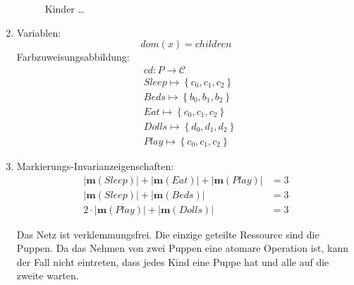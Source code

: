 \documentclass[a4paper]{scrartcl}
\begin{document}
\begin{enumerate}
\begin{figure}[h]
            \caption{Kinder \dots}
            \label{fig:children}
        \end{figure}

    \item
        Variablen:
        \begin{equation}
            dom(x) = children
        \end{equation}
        Farbzuweisungsabbildung:
        \begin{equation}
            \begin{split}
                & cd \colon P \to \mathcal{C} \\
                & Sleep \mapsto \left\{ c_0, c_1, c_2 \right\} \\
                & Beds \mapsto \left\{ b_0, b_1, b_2 \right\} \\
                & Eat \mapsto \left\{ c_0, c_1, c_2 \right\} \\
                & Dolls \mapsto \left\{ d_0, d_1, d_2 \right\} \\
                & Play \mapsto \left\{ c_0, c_1, c_2 \right\}
            \end{split}
        \end{equation}

    \item
        Markierungs-Invarianzeigenschaften:
        \begin{align}
            |\textbf{m}(Sleep)| + |\textbf{m}(Eat)| + |\textbf{m}(Play)| &= 3 \\
            |\textbf{m}(Sleep)| + |\textbf{m}(Beds)| &= 3 \\
            2 \cdot |\textbf{m}(Play)| + |\textbf{m}(Dolls)| &= 3
        \end{align}

        Das Netz ist verklemmungsfrei.
        Die einzige geteilte Ressource sind die Puppen.
        Da das Nehmen von zwei Puppen eine atomare Operation ist, kann
        der Fall nicht eintreten, dass jedes Kind eine Puppe hat und alle auf
        die zweite warten.

\end{enumerate}
\end{document}
